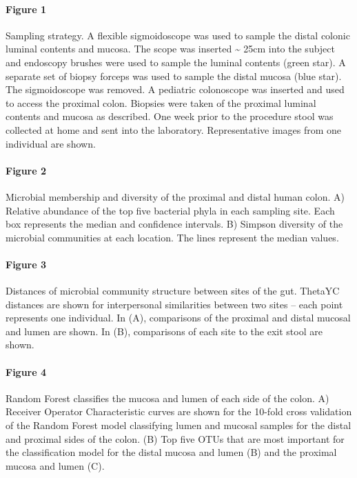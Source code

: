 \documentclass[11pt,]{article}
\let\oldparagraph\paragraph
\renewcommand{\paragraph}[1]{\oldparagraph{#1}\mbox{}}
\begin{document}
\paragraph{Figure 1}\label{figure-1}

Sampling strategy. A flexible sigmoidoscope was used to sample the
distal colonic luminal contents and mucosa. The scope was inserted
\textasciitilde{} 25cm into the subject and endoscopy brushes were used
to sample the luminal contents (green star). A separate set of biopsy
forceps was used to sample the distal mucosa (blue star). The
sigmoidoscope was removed. A pediatric colonoscope was inserted and used
to access the proximal colon. Biopsies were taken of the proximal
luminal contents and mucosa as described. One week prior to the
procedure stool was collected at home and sent into the laboratory.
Representative images from one individual are shown.

\newpage

\paragraph{Figure 2}\label{figure-2}

Microbial membership and diversity of the proximal and distal human
colon. A) Relative abundance of the top five bacterial phyla in each
sampling site. Each box represents the median and confidence intervals.
B) Simpson diversity of the microbial communities at each location. The
lines represent the median values.

\newpage

\paragraph{Figure 3}\label{figure-3}

Distances of microbial community structure between sites of the gut.
ThetaYC distances are shown for interpersonal similarities between two
sites -- each point represents one individual. In (A), comparisons of
the proximal and distal mucosal and lumen are shown. In (B), comparisons
of each site to the exit stool are shown.

\newpage

\paragraph{Figure 4}\label{figure-4}

Random Forest classifies the mucosa and lumen of each side of the colon.
A) Receiver Operator Characteristic curves are shown for the 10-fold
cross validation of the Random Forest model classifying lumen and
mucosal samples for the distal and proximal sides of the colon. (B) Top
five OTUs that are most important for the classification model for the
distal mucosa and lumen (B) and the proximal mucosa and lumen (C).
\end{document}
